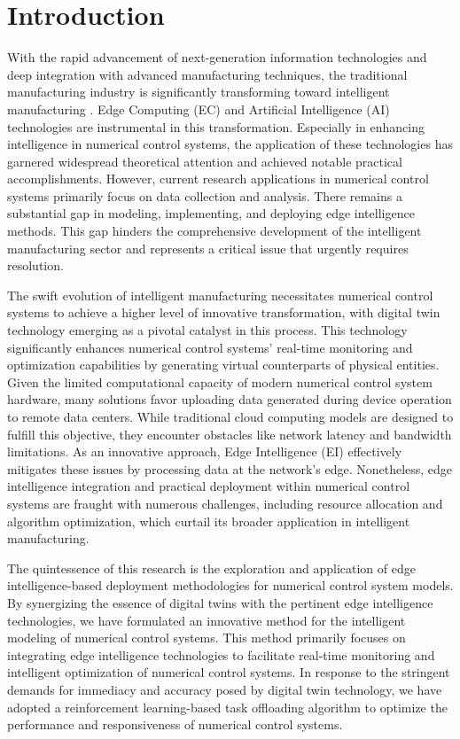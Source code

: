 \documentclass[preprint,12pt,authoryear]{elsarticle}
\begin{document}

\section{Introduction}

With the rapid advancement of next-generation information technologies and deep integration with advanced manufacturing techniques, the traditional manufacturing industry is significantly transforming toward intelligent manufacturing \cite{wang2021smart}.  Edge Computing (EC) and Artificial Intelligence (AI) technologies are instrumental in this transformation.  Especially in enhancing intelligence in numerical control systems, the application of these technologies has garnered widespread theoretical attention and achieved notable practical accomplishments.  However, current research applications in numerical control systems primarily focus on data collection and analysis.  There remains a substantial gap in modeling, implementing, and deploying edge intelligence methods.  This gap hinders the comprehensive development of the intelligent manufacturing sector and represents a critical issue that urgently requires resolution.

The swift evolution of intelligent manufacturing necessitates numerical control systems to achieve a higher level of innovative transformation, with digital twin technology emerging as a pivotal catalyst in this process. This technology significantly enhances numerical control systems' real-time monitoring and optimization capabilities by generating virtual counterparts of physical entities. Given the limited computational capacity of modern numerical control system hardware, many solutions favor uploading data generated during device operation to remote data centers. While traditional cloud computing models are designed to fulfill this objective, they encounter obstacles like network latency and bandwidth limitations. As an innovative approach, Edge Intelligence (EI) effectively mitigates these issues by processing data at the network's edge. Nonetheless, edge intelligence integration and practical deployment within numerical control systems are fraught with numerous challenges, including resource allocation and algorithm optimization, which curtail its broader application in intelligent manufacturing.

The quintessence of this research is the exploration and application of edge intelligence-based deployment methodologies for numerical control system models. By synergizing the essence of digital twins with the pertinent edge intelligence technologies, we have formulated an innovative method for the intelligent modeling of numerical control systems. This method primarily focuses on integrating edge intelligence technologies to facilitate real-time monitoring and intelligent optimization of numerical control systems. In response to the stringent demands for immediacy and accuracy posed by digital twin technology, we have adopted a reinforcement learning-based task offloading algorithm to optimize the performance and responsiveness of numerical control systems.
\end{document}

